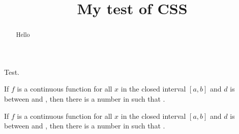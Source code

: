 \documentclass{ximera}
\title{My test of CSS}
\begin{document}
\begin{abstract}
Hello  
\end{abstract}
\maketitle

\begin{theorem}
  Test.
\end{theorem}

\begin{theorem}
If $f$ is a continuous function for all $x$ in the closed interval
$[a,b]$ and $d$ is between
 and
, then there is a
number  in
   such that
  .
\end{theorem}


\begin{theorem}
If $f$ is a continuous function for all $x$ in the closed interval
$[a,b]$ and $d$ is between
 and
, then there is a
number  in
   such that
  .
\end{theorem}
\end{document}
